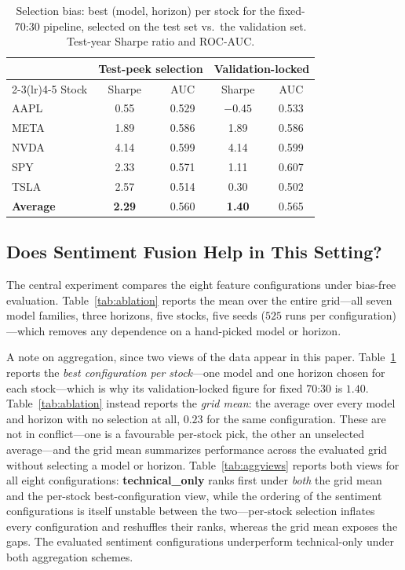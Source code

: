 \documentclass[conference]{IEEEtran}
\begin{document}
\begin{table}[t]
\caption{Selection bias: best (model, horizon) per stock for the fixed-70:30
pipeline, selected on the test set vs.\ the validation set. Test-year Sharpe
ratio and ROC-AUC.}
\label{tab:selbias}
\centering
\small
\begin{tabular}{lcccc}
\toprule
& \multicolumn{2}{c}{Test-peek selection} & \multicolumn{2}{c}{Validation-locked} \\
\cmidrule(lr){2-3}\cmidrule(lr){4-5}
Stock & Sharpe & AUC & Sharpe & AUC \\
\midrule
AAPL & 0.55 & 0.529 & $-0.45$ & 0.533 \\
META & 1.89 & 0.586 & 1.89 & 0.586 \\
NVDA & 4.14 & 0.599 & 4.14 & 0.599 \\
SPY  & 2.33 & 0.571 & 1.11 & 0.607 \\
TSLA & 2.57 & 0.514 & 0.30 & 0.502 \\
\midrule
\textbf{Average} & \textbf{2.29} & 0.560 & \textbf{1.40} & 0.565 \\
\bottomrule
\end{tabular}
\end{table}

\subsection{Does Sentiment Fusion Help in This Setting?}
The central experiment compares the eight feature configurations under bias-free
evaluation. Table~\ref{tab:ablation} reports the mean over the entire grid---all
seven model families, three horizons, five stocks, five seeds ($525$ runs per
configuration)---which removes any dependence on a hand-picked model or horizon.

A note on aggregation, since two views of the data appear in this paper.
Table~\ref{tab:selbias} reports the \emph{best configuration per stock}---one
model and one horizon chosen for each stock---which is why its
validation-locked figure for fixed 70:30 is $1.40$. Table~\ref{tab:ablation}
instead reports the \emph{grid mean}: the average over every model and horizon
with no selection at all, $0.23$ for the same configuration. These are not in
conflict---one is a favourable per-stock pick, the other an unselected
average---and the grid mean summarizes performance across the evaluated grid
without selecting a model or horizon.
Table~\ref{tab:aggviews} reports both views for all eight configurations:
\textbf{technical\_only} ranks first under \emph{both} the grid mean and the
per-stock best-configuration view, while the ordering of the sentiment
configurations is itself unstable between the two---per-stock selection inflates
every configuration and reshuffles their ranks, whereas the grid mean exposes
the gaps. The evaluated sentiment configurations underperform technical-only
under both aggregation schemes.
\end{document}
